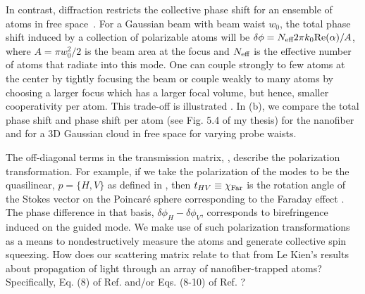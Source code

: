 \documentclass[preprint, aps,pra,onecolumn]{revtex4-1} %
\newcommand{\comment}[1]{{\color{Maroon} #1}}
\newcommand{\error}[1]{{\color{red} #1}}
\begin{document}
In contrast, diffraction restricts the collective phase shift for an ensemble of atoms in free space~\cite{tanji-suzuki_chapter_2011, baragiola_three-dimensional_2014}.  For a Gaussian beam with beam waist $w_0$, the total phase shift induced by a collection of polarizable atoms will be $\delta \phi = N_{\text{eff}} 2 \pi k_0 {\rm Re}({\alpha})/A$, where $A = \pi w^2_0/2$ is the beam area at the focus and $N_{\text{eff}}$ is the effective number of atoms that radiate into this mode.  
One can couple strongly to few atoms at the center by tightly focusing the beam or couple weakly to many atoms by choosing a larger focus which has a larger focal volume, but hence, smaller cooperativity per atom.  
This trade-off is illustrated .  
\error{In (b), we compare the total phase shift and phase shift per atom (see Fig. 5.4 of my thesis) for the nanofiber and for a 3D Gaussian cloud in free space for varying probe waists. }

The off-diagonal terms in the transmission matrix, , describe the polarization transformation. For example, if we take the polarization of the modes to be the quasilinear, $p = \{H,V\}$ as defined in , then $t_{HV} \equiv \chi_{\rm Far}$ is the rotation angle of the Stokes vector on the Poincar\'{e} sphere corresponding to the Faraday effect \cite{}.  
The phase difference in that basis, $\delta  \phi_H - \delta \phi_V$, corresponds to birefringence induced on the guided mode.  
We make use of such polarization transformations as a means to nondestructively measure the atoms and generate collective spin squeezing.
\comment{How does our scattering matrix relate to that from Le Kien's results about propagation of light through an array of nanofiber-trapped atoms?  Specifically, Eq. (8) of Ref. \cite{le_kien_correlations_2008} and/or Eqs. (8-10) of Ref. \cite{le_kien_propagation_2014}?  
}
\end{document}
